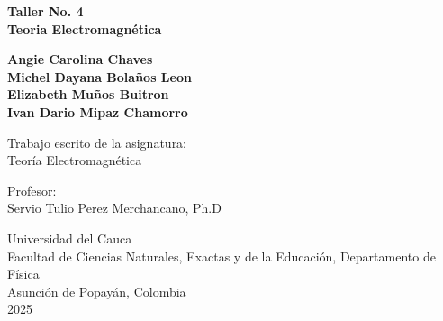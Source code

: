 \begin{titlepage}

    \begin{center}

        {\fontsize{17}{17}\selectfont \textbf{{Taller No. 4 \\ Teoria Electromagnética }}}
            
        \vfill

        {\textbf{Angie Carolina Chaves\\
        Michel Dayana Bolaños Leon\\
        Elizabeth Muños Buitron\\
        Ivan Dario Mipaz Chamorro\\}
        }
               
        \vfill
        
        {Trabajo  escrito de la asignatura:}\\
        {Teoría Electromagnética}
        
        \vfill
        
        {Profesor:}\\
        {Servio Tulio Perez Merchancano}, {Ph.D}

        
        \vfill

        {Universidad del Cauca}\\
        {Facultad de Ciencias Naturales, Exactas y de la Educación, Departamento de Física}\\
        {Asunción de Popayán, Colombia}\\
        {2025}
        
        \end{center}

\end{titlepage}
